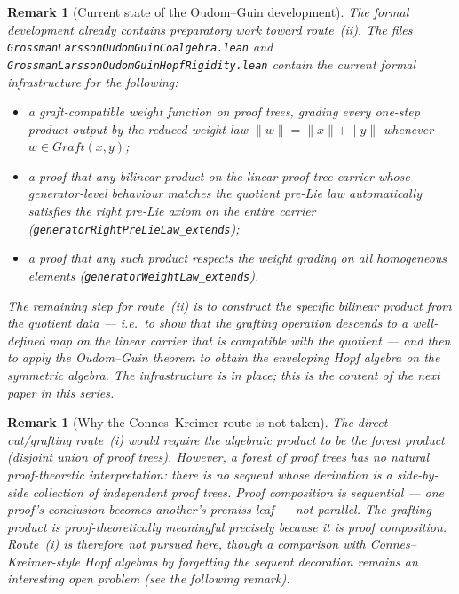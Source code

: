 \documentclass[11pt]{article}
\newtheorem{remark}[theorem]{Remark}
\newcommand{\Graft}{\mathit{Graft}}
\begin{document}
\begin{remark}[Current state of the Oudom--Guin development]
The formal development already contains preparatory work toward route~(ii).
The files \texttt{GrossmanLarssonOudomGuinCoalgebra.lean} and
\texttt{GrossmanLarssonOudomGuinHopfRigidity.lean} contain the current
formal infrastructure for the following:
\begin{itemize}
\item a graft-compatible weight function on proof trees, grading every
one-step product output by the reduced-weight law
\(\|w\|=\|x\|+\|y\|\) whenever \(w\in\Graft(x,y)\);
\item a proof that any bilinear product on the linear proof-tree carrier whose
generator-level behaviour matches the quotient pre-Lie law automatically
satisfies the right pre-Lie axiom on the entire carrier \newline 
(\texttt{generatorRightPreLieLaw\_extends});
\item a proof that any such product respects the weight grading on all
homogeneous elements (\texttt{generatorWeightLaw\_extends}).
\end{itemize}
The remaining step for route~(ii) is to construct the specific bilinear
product from the quotient data --- i.e.\ to show that the grafting operation
descends to a well-defined map on the linear carrier that is compatible with
the quotient --- and then to apply the Oudom--Guin theorem to obtain the
enveloping Hopf algebra on the symmetric algebra. The infrastructure is in
place; this is the content of the next paper in this series.
\end{remark}

\begin{remark}[Why the Connes--Kreimer route is not taken]
The direct cut/grafting route~(i) would require the algebraic product to be
the forest product (disjoint union of proof trees). However, a forest of proof
trees has no natural proof-theoretic interpretation: there is no sequent whose
derivation \emph{is} a side-by-side collection of independent proof trees.
Proof composition is sequential --- one proof's conclusion becomes another's
premiss leaf --- not parallel. The grafting product is proof-theoretically
meaningful precisely because it is proof composition. Route~(i) is therefore
not pursued here, though a comparison with Connes--Kreimer-style Hopf algebras
by forgetting the sequent decoration remains an interesting open problem (see
the following remark).
\end{remark}
\end{document}
